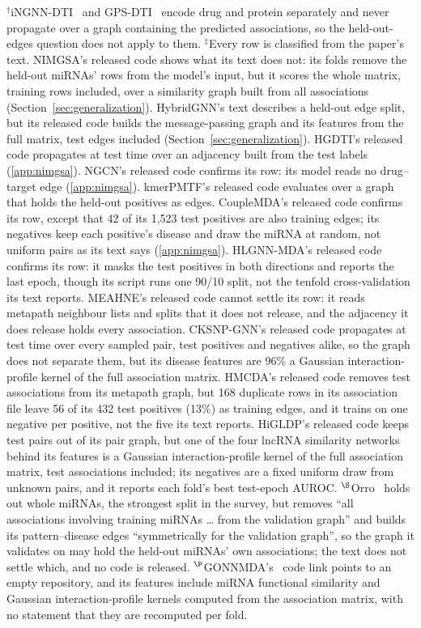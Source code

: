 \begin{table}[h!]
\medskip\par $^{\dagger}$iNGNN-DTI~\cite{sun2024ingnndti} and GPS-DTI~\cite{xiong2025gpsdti} encode drug and protein separately and never
propagate over a graph containing the predicted associations, so the held-out-edges
question does not apply to them.
$^{\ddagger}$Every row is classified from the paper's text. NIMGSA's released code shows what its text
does not: its folds remove the held-out miRNAs' rows from the model's input, but it scores the whole
matrix, training rows included, over a similarity graph built from all associations
(Section~\ref{sec:generalization}). HybridGNN's text describes a held-out edge split, but its released
code builds the message-passing graph and its features from the full matrix, test edges included
(Section~\ref{sec:generalization}). HGDTI's released code propagates at test time over an adjacency built from
the test labels (\ref{app:nimgsa}). NGCN's released code confirms its row: its model reads no
drug--target edge (\ref{app:nimgsa}). kmerPMTF's released code evaluates over a graph that holds the
held-out positives as edges. CoupleMDA's released code confirms its row, except that 42 of its 1,523 test
positives are also training edges; its negatives keep each positive's disease and draw the miRNA at random, not
uniform pairs as its text says (\ref{app:nimgsa}). HLGNN-MDA's released code confirms its row: it masks the test
positives in both directions and reports the last epoch, though its script runs one 90/10 split, not the
tenfold cross-validation its text reports. MEAHNE's released code cannot settle its row: it reads metapath
neighbour lists and splits that it does not release, and the adjacency it does release holds every association. CKSNP-GNN's released code propagates at test time over every sampled pair,
test positives and negatives alike, so the graph does not separate them, but its disease features are 96\% a
Gaussian interaction-profile kernel of the full association matrix. HMCDA's released code removes test
associations from its metapath graph, but 168 duplicate rows in its association file leave 56 of its 432 test
positives (13\%) as training edges, and it trains on one negative per positive, not the five its text reports. HiGLDP's released code keeps test pairs out of its pair graph, but one of the four lncRNA similarity networks behind its features is a Gaussian interaction-profile kernel of the full association matrix, test associations included; its negatives are a fixed uniform draw from unknown pairs, and it reports each fold's best test-epoch AUROC.
$^{\S}$Orro~\cite{orro2026mirnadisease} holds out whole miRNAs, the strongest split in the survey, but removes
``all associations involving training miRNAs \ldots{} from the validation graph'' and builds its
pattern--disease edges ``symmetrically for the validation graph'', so the graph it validates on may
hold the held-out miRNAs' own associations; the text does not settle which, and no code is released.
$^{\P}$GONNMDA's~\cite{zeng2025gonnmda} code link points to an empty repository, and its features include miRNA
functional similarity and Gaussian interaction-profile kernels computed from the association matrix, with no
statement that they are recomputed per fold.
\end{table}
